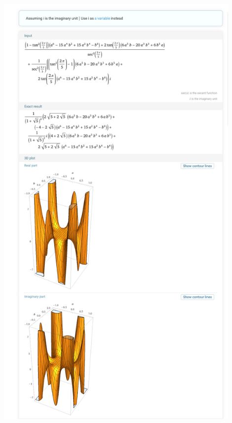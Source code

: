 \documentclass{article}
\begin{document}
\begin{minipage}{0.6\textwidth}
    \centering
    \includegraphics[width=0.9\textwidth]{R(z)^6.png}
    \caption{$R(z)^6$}
\end{minipage}%
\end{document}
